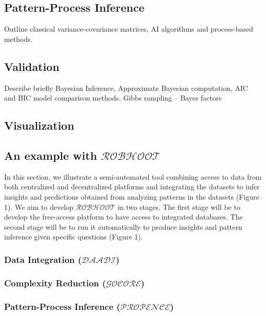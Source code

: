 \documentclass[english,12pt]{article}
\begin{document}
\subsection{Pattern-Process Inference}

Outline classical variance-covariance matrices, AI
algorithms and process-based methods.

\subsection{Validation}

Describe briefly Bayesian Inference, Approximate Bayesian computation,
AIC and BIC model comparison methods.  Gibbs sampling -- Bayes factors


\subsection{Visualization}


\subsection{An example with $\mathcal{ROBHOOT}$}

In this section, we illustrate a semi-automated tool combining access
to data from both centralized and decentralized platforms and
integrating the datasets to infer insights and predictions obtained
from analyzing patterns in the datasets (Figure 1). We aim to develop
$\mathcal{ROBHOOT}$ in two stages. The first stage will be to develop
the free-access platform to have access to integrated databases. The
second stage will be to run it automatically to produce insights and
pattern inference given specific questions (Figure 1).

\subsubsection{Data Integration ($\mathcal{DAADI}$)}

\subsubsection{Complexity Reduction ($\mathcal{GOCORE}$)}

\subsubsection{Pattern-Process Inference ($\mathcal{PROPENCE}$)}
  
\end{document}
